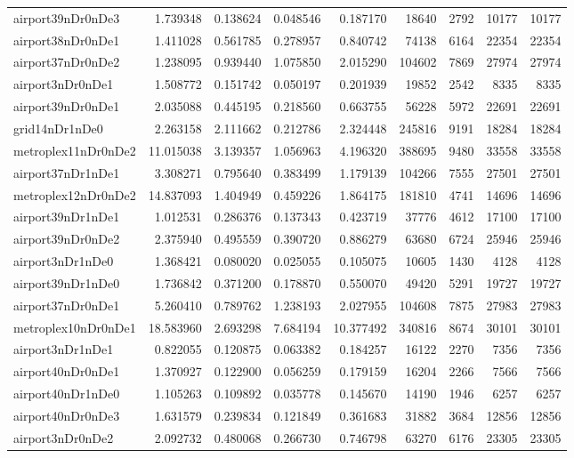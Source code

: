 \begin{longtable}{|l|r|r|r|r|r|r|r|r|}
airport39nDr0nDe3 & 1.739348 & 0.138624 & 0.048546 & 0.187170 & 18640 & 2792 & 10177 & 10177 \\
airport38nDr0nDe1 & 1.411028 & 0.561785 & 0.278957 & 0.840742 & 74138 & 6164 & 22354 & 22354 \\
airport37nDr0nDe2 & 1.238095 & 0.939440 & 1.075850 & 2.015290 & 104602 & 7869 & 27974 & 27974 \\
airport3nDr0nDe1 & 1.508772 & 0.151742 & 0.050197 & 0.201939 & 19852 & 2542 & 8335 & 8335 \\
airport39nDr0nDe1 & 2.035088 & 0.445195 & 0.218560 & 0.663755 & 56228 & 5972 & 22691 & 22691 \\
grid14nDr1nDe0 & 2.263158 & 2.111662 & 0.212786 & 2.324448 & 245816 & 9191 & 18284 & 18284 \\
metroplex11nDr0nDe2 & 11.015038 & 3.139357 & 1.056963 & 4.196320 & 388695 & 9480 & 33558 & 33558 \\
airport37nDr1nDe1 & 3.308271 & 0.795640 & 0.383499 & 1.179139 & 104266 & 7555 & 27501 & 27501 \\
metroplex12nDr0nDe2 & 14.837093 & 1.404949 & 0.459226 & 1.864175 & 181810 & 4741 & 14696 & 14696 \\
airport39nDr1nDe1 & 1.012531 & 0.286376 & 0.137343 & 0.423719 & 37776 & 4612 & 17100 & 17100 \\
airport39nDr0nDe2 & 2.375940 & 0.495559 & 0.390720 & 0.886279 & 63680 & 6724 & 25946 & 25946 \\
airport3nDr1nDe0 & 1.368421 & 0.080020 & 0.025055 & 0.105075 & 10605 & 1430 & 4128 & 4128 \\
airport39nDr1nDe0 & 1.736842 & 0.371200 & 0.178870 & 0.550070 & 49420 & 5291 & 19727 & 19727 \\
airport37nDr0nDe1 & 5.260410 & 0.789762 & 1.238193 & 2.027955 & 104608 & 7875 & 27983 & 27983 \\
metroplex10nDr0nDe1 & 18.583960 & 2.693298 & 7.684194 & 10.377492 & 340816 & 8674 & 30101 & 30101 \\
airport3nDr1nDe1 & 0.822055 & 0.120875 & 0.063382 & 0.184257 & 16122 & 2270 & 7356 & 7356 \\
airport40nDr0nDe1 & 1.370927 & 0.122900 & 0.056259 & 0.179159 & 16204 & 2266 & 7566 & 7566 \\
airport40nDr1nDe0 & 1.105263 & 0.109892 & 0.035778 & 0.145670 & 14190 & 1946 & 6257 & 6257 \\
airport40nDr0nDe3 & 1.631579 & 0.239834 & 0.121849 & 0.361683 & 31882 & 3684 & 12856 & 12856 \\
airport3nDr0nDe2 & 2.092732 & 0.480068 & 0.266730 & 0.746798 & 63270 & 6176 & 23305 & 23305 \\

\end{longtable}
